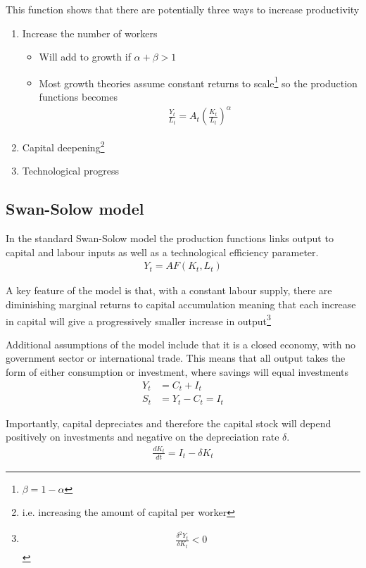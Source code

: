 \documentclass{tufte-handout}
\begin{document}
This function shows that there are potentially three ways to increase productivity
\begin{enumerate}
  \item Increase the number of workers
  \begin{itemize}
    \item Will add to growth if $\alpha+\beta>1$
    \item Most growth theories assume constant returns to scale\footnote{$\beta=1-\alpha$} so the production functions becomes
    \begin{align*}
      \frac{Y_t}{L_t}= A_t \left(\frac{K_t}{L_t} \right)^{\alpha}
    \end{align*}
  \end{itemize}
  \item Capital deepening\footnote{i.e. increasing the amount of capital per worker}
  \item Technological progress  
\end{enumerate}

\subsection{Swan-Solow model}
In the standard Swan-Solow model the production functions links output to capital and labour inputs as well as a technological efficiency parameter.
\begin{align*}
  Y_t = AF(K_t,L_t) 
\end{align*}


A key feature of the model is that, with a constant labour supply, there are diminishing marginal returns to capital accumulation meaning that each increase in capital will give a progressively smaller increase in output\footnote{
\begin{align*}
  \frac{\delta^2Y_t}{\delta K_t}<0
\end{align*}}

Additional assumptions of the model include that it is a closed economy, with no government sector or international trade. 
This means that all output takes the form of either consumption or investment, where savings will equal investments
\begin{align*}
      Y_t &= C_t+I_t\\
      S_t &= Y_t-C_t=I_t
\end{align*}
 
Importantly, capital depreciates and therefore the capital stock will depend positively on investments and negative on the depreciation rate $\delta$.
\begin{align*}
  \frac{dK_t}{dt}=I_t -\delta K_t
\end{align*}
\end{document}
